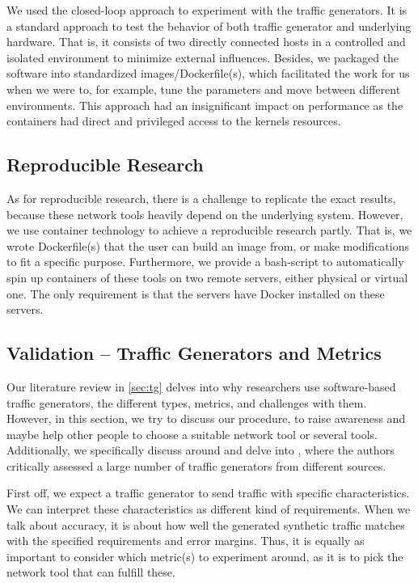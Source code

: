 We used the closed-loop approach to experiment with the traffic generators.
It is a standard approach to test the behavior of both traffic generator and underlying hardware.
That is, it consists of two directly connected hosts in a controlled and isolated environment to minimize external influences.
Besides, we packaged the software into standardized images/Dockerfile(s), which facilitated the work for us when we were to, for example, tune the parameters and move between different environments.
This approach had an insignificant impact on performance as the containers had direct and privileged access to the kernels resources.

\subsection{Reproducible Research}
As for reproducible research, there is a challenge to replicate the exact results, because these network tools heavily depend on the underlying system.
However, we use container technology to achieve a reproducible research partly.
That is, we wrote Dockerfile(s) that the user can build an image from, or make modifications to fit a specific purpose.
Furthermore, we provide a bash-script to automatically spin up containers of these tools on two remote servers, either physical or virtual one.
The only requirement is that the servers have Docker installed on these servers.

\subsection{Validation -- Traffic Generators and Metrics}\label{discuss:tgme}
Our literature review in \cref{sec:tg} delves into why researchers use software-based traffic generators, the different types, metrics, and challenges with them.
However, in this section, we try to discuss our procedure, to raise awareness and maybe help other people to choose a suitable network tool or several tools.
Additionally, we specifically discuss around and delve into \cite{botta2010you, molnar2013validate}, where the authors critically assessed a large number of traffic generators from different sources.

\skippara First off, we expect a traffic generator to send traffic with specific characteristics.
We can interpret these characteristics as different kind of requirements.
When we talk about accuracy, it is about how well the generated synthetic traffic matches with the specified requirements and error margins.
Thus, it is equally as important to consider which metric(s) to experiment around, as it is to pick the network tool that can fulfill these.


